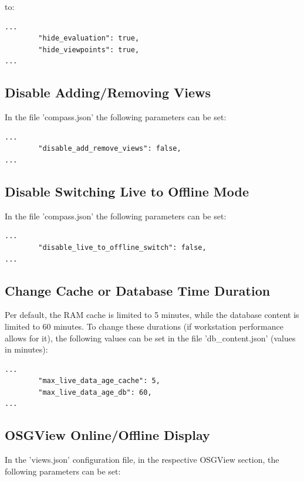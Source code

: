to:
\begin{lstlisting}
...
        "hide_evaluation": true,
        "hide_viewpoints": true,
...        
\end{lstlisting}

\subsection{Disable Adding/Removing Views}

In the file 'compass.json' the following parameters can be set:

\begin{lstlisting}
...
        "disable_add_remove_views": false,
...        
\end{lstlisting}

\subsection{Disable Switching Live to Offline Mode}

In the file 'compass.json' the following parameters can be set:

\begin{lstlisting}
...
        "disable_live_to_offline_switch": false,
...        
\end{lstlisting}

\subsection{Change Cache or Database Time Duration}

Per default, the RAM cache is limited to 5 minutes, while the database content is limited to 60 minutes. To change these durations (if workstation performance allows for it), the following values can be set in the file 'db\_content.json' (values in minutes):

\begin{lstlisting}
...
        "max_live_data_age_cache": 5,
        "max_live_data_age_db": 60,
...        
\end{lstlisting}

\subsection{OSGView Online/Offline Display}
\label{sec:live_online_offline}

In the 'views.json' configuration file, in the respective OSGView section, the following parameters can be set:

